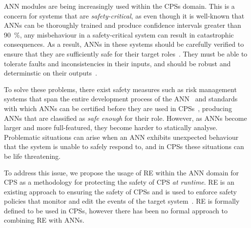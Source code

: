 \ac{ANN} modules are being increasingly used within the \acp{CPS} domain.
This is a concern for systems that are \textit{safety-critical}, as even though it is well-known that \acp{ANN} can be thoroughly trained and produce confidence intervals greater than 90~\%, any misbehaviour in a safety-critical system can result in  catastrophic consequences.
As a result, \acp{ANN} in these systems should be carefully verified to ensure that they are sufficiently safe for their target roles~\cite{scann, ANNSafetyLifecycle2003}.
They must be able to tolerate faults and inconsistencies in their inputs, and should be robust and determinstic on their outputs~\cite{EstSafeCriteria2003}.

To solve these problems, there exist safety measures such as risk management systems that span the entire development process of the \ac{ANN}~\cite{ANNDevModel1999} and standards with which \acp{ANN} can be certified before they are used in \acp{CPS}~\cite{SCANNStandard}, producing \acp{ANN} that are classified as \textit{safe enough} for their role. 
However, as \acp{ANN} become larger and more full-featured, they  become harder to statically analyse.
Problematic situations can arise when an \ac{ANN} exhibits unexpected behaviour that the system is unable to safely respond to, and in \acp{CPS} these situations can be life threatening.

To address this issue, we propose the usage of \ac{RE} within the \ac{ANN} domain for \ac{CPS} as a methodology for protecting the safety of \ac{CPS} \textit{at runtime}.
\ac{RE} is an existing approach to ensuring the safety of \acp{CPS} and is used to enforce safety policies that monitor and edit the events of the target system~\cite{rta-cps}.
\ac{RE} is formally defined to be used in \acp{CPS}, however there has been no formal approach to combining \ac{RE} with \acp{ANN}. 

